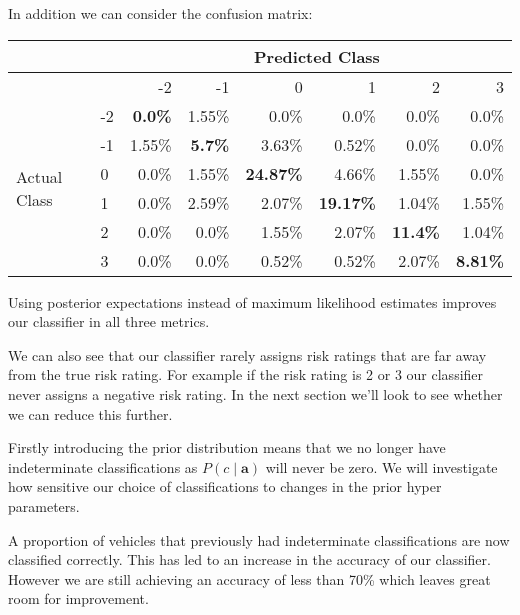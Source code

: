 In addition we can consider the confusion matrix:
\begin{center}
    \begin{tabular}{l l r r r r r r}
    \hline
                       &    & \multicolumn{6}{c}{Predicted Class}                   \\
    \hline
                       &    & -2      & -1    & 0       & 1       & 2       & 3     \\
    \hline
    \multirow{6}{*}{Actual Class} & -2 & \textbf{0.0\%}  & 1.55\% & 0.0\%   & 0.0\%   & 0.0\%  & 0.0\%  \\
                       & -1 & 1.55\% & \textbf{5.7\%}   & 3.63\%  & 0.52\%  & 0.0\%  & 0.0\%  \\
                       & 0  & 0.0\%  & 1.55\% & \textbf{24.87\%}  & 4.66\%  & 1.55\% & 0.0\%  \\
                       & 1  & 0.0\%  & 2.59\% & 2.07\%  & \textbf{19.17\%}  & 1.04\% & 1.55\% \\
                       & 2  & 0.0\%  & 0.0\%  & 1.55\%  & 2.07\%  & \textbf{11.4\%}  & 1.04\% \\
                       & 3  & 0.0\%  & 0.0\%  & 0.52\%  & 0.52\%  & 2.07\% & \textbf{8.81\%} \\
    \hline
    \end{tabular}
\end{center}

Using posterior expectations instead of maximum likelihood estimates improves our classifier in all three metrics.

We can also see that our classifier rarely assigns risk ratings that are far away from the true risk rating.
For example if the risk rating is 2 or 3 our classifier never assigns a negative risk rating.
In the next section we'll look to see whether we can reduce this further.

Firstly introducing the prior distribution means that we no longer have indeterminate classifications as $P(c \mid \mathbf{a})$ will never be zero.
We will investigate how sensitive our choice of classifications to changes in the prior hyper parameters.

A proportion of vehicles that previously had indeterminate classifications are now classified correctly.
This has led to an increase in the accuracy of our classifier.
However we are still achieving an accuracy of less than 70\% which leaves great room for improvement.

